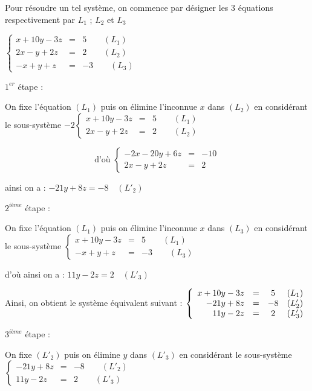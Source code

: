 \documentclass[12pt,a4paper]{article}
\begin{document}
	Pour résoudre un tel système, on commence par désigner les $3$ équations respectivement par $L_{1}$ ; $L_{2}$ et $L_{3}$

	$\left\lbrace\begin{array}{lcl}x+10y-3z& =& 5\qquad\left(L_{1}\right)\\2x-y+2z& =& 2\qquad\left(L_{2}\right)\\-x+y+z& =& -3\qquad\left(L_{3}\right)\end{array}\right.$

	$1^{er}$ étape : 


	On fixe l'équation $\left(L_{1}\right)$ puis on élimine l'inconnue $x$ dans $\left(L_{2}\right)$ en considérant le sous-système $-2\left\lbrace\begin{array}{lcl}x+10y-3z& =& 5\qquad\left(L_{1}\right)\\2x-y+2z& =& 2\qquad\left(L_{2}\right)\end{array}\right.$


	$$\text{d'où }\left\lbrace\begin{array}{lcl}-2x-20y+6z& =& -10\\2x-y+2z& =& 2\end{array}\right.$$
	
	ainsi on a : $-21y+8z=-8\quad\left(L'_{2}\right)$

$2^{ième}$ étape :

	On fixe l'équation $\left(L_{1}\right)$ puis on élimine l'inconnue $x$ dans $\left(L_{3}\right)$ en considérant le sous-système $\left\lbrace\begin{array}{lcl}x+10y-3z&=&5\qquad\left(L_{1}\right)\\-x+y+z&=&-3\qquad\left(L_{3}\right)\end{array}\right.$

	d'où ainsi on a : $11y-2z=2\quad\left(L'_{3}\right)$

	Ainsi, on obtient le système équivalent suivant : 
	$
    \left\{
    \begin{array}{rcc l}
    x + 10y - 3z &=& 5 & (L_1) \\
    -21y + 8z &=& -8 & (L'_2) \\
    11y - 2z &=& 2 & (L'_3)
    \end{array}
    \right.
    $

$3^{ième}$ étape :

	On fixe $\left(L'_{2}\right)$ puis on élimine $y$ dans $\left(L'_{3}\right)$ en considérant le sous-système $\left\lbrace\begin{array}{lcl}-21y+8z& =& -8\qquad\left(L'_{2}\right)\\11y-2z& =& 2\qquad\left(L'_{3}\right)\end{array}\right.$
\end{document}
